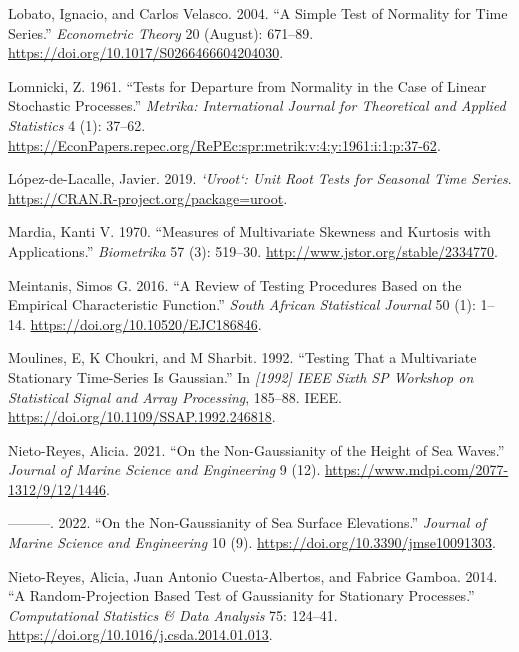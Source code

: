 \begin{CSLReferences}{1}{0}
\leavevmode{}%
Lobato, Ignacio, and Carlos Velasco. 2004. {``A Simple Test of Normality for Time Series.''} \emph{Econometric Theory} 20 (August): 671--89. \url{https://doi.org/10.1017/S0266466604204030}.

\leavevmode{}%
Lomnicki, Z. 1961. {``Tests for Departure from Normality in the Case of Linear Stochastic Processes.''} \emph{Metrika: International Journal for Theoretical and Applied Statistics} 4 (1): 37--62. \url{https://EconPapers.repec.org/RePEc:spr:metrik:v:4:y:1961:i:1:p:37-62}.

\leavevmode{}%
López-de-Lacalle, Javier. 2019. \emph{`Uroot`: Unit Root Tests for Seasonal Time Series}. \url{https://CRAN.R-project.org/package=uroot}.

\leavevmode{}%
Mardia, Kanti V. 1970. {``Measures of Multivariate Skewness and Kurtosis with Applications.''} \emph{Biometrika} 57 (3): 519--30. \url{http://www.jstor.org/stable/2334770}.

\leavevmode{}%
Meintanis, Simos G. 2016. {``A Review of Testing Procedures Based on the Empirical Characteristic Function.''} \emph{South African Statistical Journal} 50 (1): 1--14. \url{https://doi.org/10.10520/EJC186846}.

\leavevmode{}%
Moulines, E, K Choukri, and M Sharbit. 1992. {``Testing That a Multivariate Stationary Time-Series Is {G}aussian.''} In \emph{{[}1992{]} IEEE Sixth SP Workshop on Statistical Signal and Array Processing}, 185--88. IEEE. \url{https://doi.org/10.1109/SSAP.1992.246818}.

\leavevmode{}%
Nieto-Reyes, Alicia. 2021. {``On the Non-{G}aussianity of the Height of Sea Waves.''} \emph{Journal of Marine Science and Engineering} 9 (12). \url{https://www.mdpi.com/2077-1312/9/12/1446}.

\leavevmode{}%
---------. 2022. {``On the Non-{G}aussianity of Sea Surface Elevations.''} \emph{Journal of Marine Science and Engineering} 10 (9). \url{https://doi.org/10.3390/jmse10091303}.

\leavevmode{}%
Nieto-Reyes, Alicia, Juan Antonio Cuesta-Albertos, and Fabrice Gamboa. 2014. {``A Random-Projection Based Test of {G}aussianity for Stationary Processes.''} \emph{Computational Statistics \& Data Analysis} 75: 124--41. \url{https://doi.org/10.1016/j.csda.2014.01.013}.


\end{CSLReferences}
